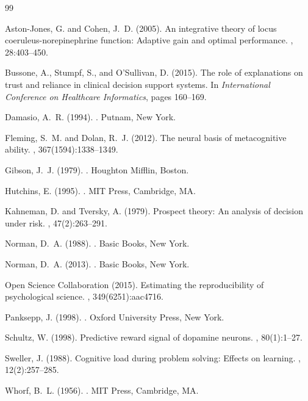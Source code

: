\documentclass[11pt,a4paper]{article}
\begin{document}
\begin{thebibliography}{99}

Aston-Jones, G. and Cohen, J.~D. (2005).
\newblock An integrative theory of locus coeruleus-norepinephrine function: Adaptive gain and optimal performance.
, 28:403--450.

Bussone, A., Stumpf, S., and O'Sullivan, D. (2015).
\newblock The role of explanations on trust and reliance in clinical decision support systems.
\newblock In {\em International Conference on Healthcare Informatics}, pages 160--169.

Damasio, A.~R. (1994).
.
\newblock Putnam, New York.

Fleming, S.~M. and Dolan, R.~J. (2012).
\newblock The neural basis of metacognitive ability.
, 367(1594):1338--1349.

Gibson, J.~J. (1979).
.
\newblock Houghton Mifflin, Boston.

Hutchins, E. (1995).
.
\newblock MIT Press, Cambridge, MA.

Kahneman, D. and Tversky, A. (1979).
\newblock Prospect theory: An analysis of decision under risk.
, 47(2):263--291.

Norman, D.~A. (1988).
.
\newblock Basic Books, New York.

Norman, D.~A. (2013).
.
\newblock Basic Books, New York.

Open Science Collaboration (2015).
\newblock Estimating the reproducibility of psychological science.
, 349(6251):aac4716.

Panksepp, J. (1998).
.
\newblock Oxford University Press, New York.

Schultz, W. (1998).
\newblock Predictive reward signal of dopamine neurons.
, 80(1):1--27.

Sweller, J. (1988).
\newblock Cognitive load during problem solving: Effects on learning.
, 12(2):257--285.

Whorf, B.~L. (1956).
.
\newblock MIT Press, Cambridge, MA.

\end{thebibliography}
\end{document}
